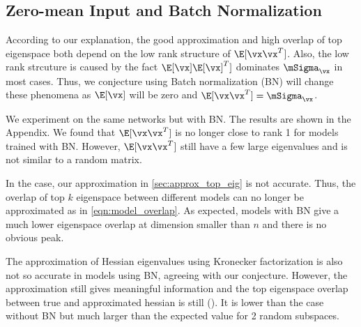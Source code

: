 \subsection{Zero-mean Input and Batch Normalization}
According to our explanation, the good approximation and high overlap of top eigenspace both depend on the low rank structure of $\E[\vx\vx^T]$. Also, the low rank strcuture is caused by the fact $\E[\vx]\E[\vx]^T]$ dominates $\mSigma_\vx$ in most cases. Thus, we conjecture using Batch normalization (BN) \citep{ioffe2015batch} will change these phenomena as $\E[\vx]$ will be zero and $\E[\vx\vx^T] = \mSigma_\vx$.

We experiment on the same networks but with BN. The results are shown in the Appendix. We found that $\E[\vx\vx^T]$ is no longer close to rank 1 for models trained with BN. However, $\E[\vx\vx^T]$ still have a few large eigenvalues and is not similar to a random matrix.

In the case, our approximation in \cref{sec:approx_top_eig} is not accurate. Thus, the overlap of top $k$ eigenspace between different models can no longer be approximated as in \cref{eqn:model_overlap}. As expected, models with BN give a much lower eigenspace overlap at dimension smaller than $n$ and there is no obvious peak.

The approximation of Hessian eigenvalues using Kronecker factorization is also not so accurate in models using BN, agreeing with our conjecture. However, the approximation still gives meaningful information and the top eigenspace overlap between true and approximated hessian is still (). It is lower than the case without BN but much larger than the expected value for 2 random subspaces.